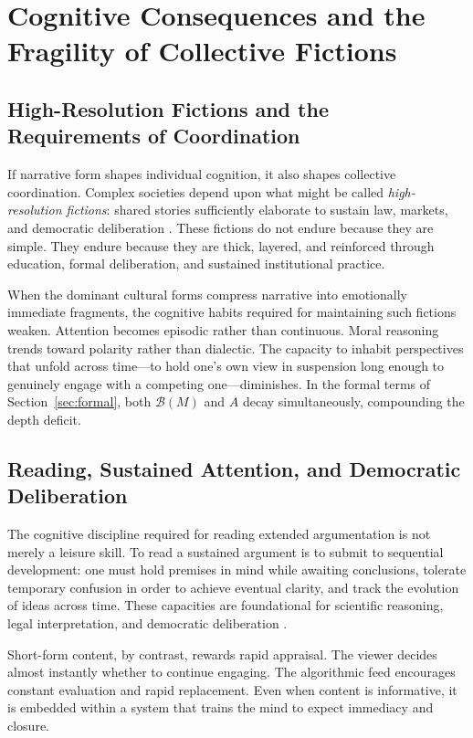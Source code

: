 \documentclass[12pt]{article}
\theoremstyle{definition}
\theoremstyle{plain}
\begin{document}
\section{Cognitive Consequences and the Fragility of Collective Fictions}
\label{sec:cognitive}

\subsection{High-Resolution Fictions and the Requirements of Coordination}

If narrative form shapes individual cognition, it also shapes collective coordination. Complex societies depend upon what might be called \emph{high-resolution fictions}: shared stories sufficiently elaborate to sustain law, markets, and democratic deliberation \citep{Harari2015}. These fictions do not endure because they are simple. They endure because they are thick, layered, and reinforced through education, formal deliberation, and sustained institutional practice.

When the dominant cultural forms compress narrative into emotionally immediate fragments, the cognitive habits required for maintaining such fictions weaken. Attention becomes episodic rather than continuous. Moral reasoning trends toward polarity rather than dialectic. The capacity to inhabit perspectives that unfold across time---to hold one's own view in suspension long enough to genuinely engage with a competing one---diminishes. In the formal terms of Section~\ref{sec:formal}, both $\mathcal{B}(M)$ and $A$ decay simultaneously, compounding the depth deficit.

\subsection{Reading, Sustained Attention, and Democratic Deliberation}

The cognitive discipline required for reading extended argumentation is not merely a leisure skill. To read a sustained argument is to submit to sequential development: one must hold premises in mind while awaiting conclusions, tolerate temporary confusion in order to achieve eventual clarity, and track the evolution of ideas across time. These capacities are foundational for scientific reasoning, legal interpretation, and democratic deliberation \citep{Postman1985, Carr2010}.

Short-form content, by contrast, rewards rapid appraisal. The viewer decides almost instantly whether to continue engaging. The algorithmic feed encourages constant evaluation and rapid replacement. Even when content is informative, it is embedded within a system that trains the mind to expect immediacy and closure.
\end{document}
